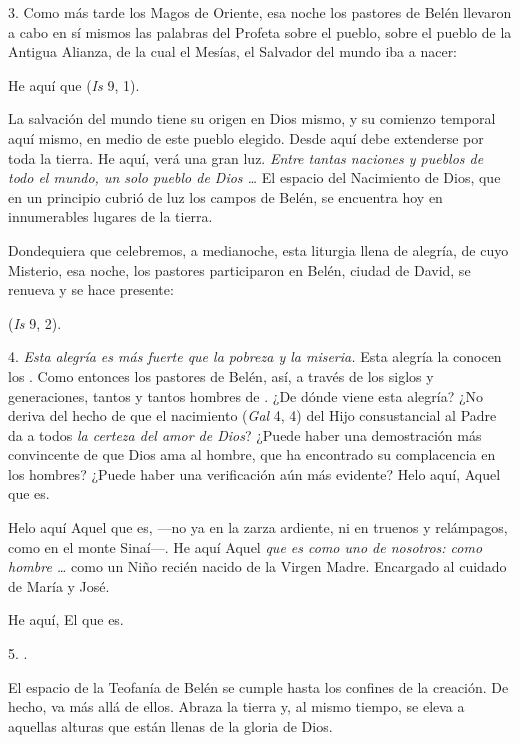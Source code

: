 \begin{body}
	3. Como más tarde los Magos de Oriente, esa noche los pastores de Belén llevaron a cabo en sí mismos las palabras del Profeta sobre el pueblo, sobre el pueblo de la Antigua Alianza, de la cual el Mesías, el Salvador del mundo iba a nacer:
	
	He aquí que  (\emph{Is} 9, 1).
	
	La salvación del mundo tiene su origen en Dios mismo, y su comienzo temporal aquí mismo, en medio de este pueblo elegido. Desde aquí debe extenderse por toda la tierra. He aquí,  verá una gran luz. \emph{Entre tantas naciones y pueblos de todo el mundo, un solo pueblo de Dios \ldots{}} El espacio del Nacimiento de Dios, que en un principio cubrió de luz los campos de Belén, se encuentra hoy en innumerables lugares de la tierra.
	
	Dondequiera que celebremos, a medianoche, esta liturgia llena de alegría, de cuyo Misterio, esa noche, los pastores participaron en Belén, ciudad de David, se renueva y se hace presente:
	
	 (\emph{Is} 9, 2).
	
	4. \emph{Esta alegría es más fuerte que la pobreza y la miseria.} Esta alegría la conocen los . Como entonces los pastores de Belén, así, a través de los siglos y generaciones, tantos y tantos hombres de . ¿De dónde viene esta alegría? ¿No deriva del hecho de que el nacimiento  (\emph{Gal} 4, 4) del Hijo consustancial al Padre da a todos \emph{la certeza del amor de Dios}? ¿Puede haber una demostración más convincente de que Dios ama al hombre, que ha encontrado su complacencia en los hombres? ¿Puede haber una verificación aún más evidente? Helo aquí, Aquel que es.
	
	Helo aquí Aquel que es, ---no ya en la zarza ardiente, ni en truenos y relámpagos, como en el monte Sinaí---. He aquí Aquel \emph{que es como uno de nosotros: como hombre \ldots{}} como un Niño recién nacido de la Virgen Madre. Encargado al cuidado de María y José.
	
	He aquí, El que es.
	
	5. .
	
	El espacio de la Teofanía de Belén se cumple hasta los confines de la creación. De hecho, va más allá de ellos. Abraza la tierra y, al mismo tiempo, se eleva a aquellas alturas que están llenas de la gloria de Dios.
	

\end{body}
